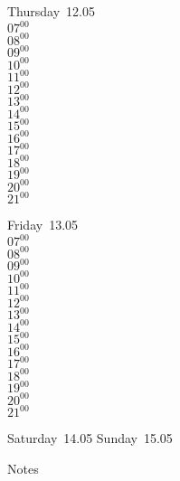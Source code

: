 \documentclass[11pt,a4paper]{book}\usepackage[]{graphicx}\usepackage[]{color}
\begin{document}
\clearpage
\begin{headerbox}
\end{headerbox}
\begin{weekdaybox}
  Thursday~12.05\\
  { 
  \vfill
  $07^{00}$\\
$08^{00}$\\
$09^{00}$\\
$10^{00}$\\
$11^{00}$\\
$12^{00}$\\
$13^{00}$\\
$14^{00}$\\
$15^{00}$\\
$16^{00}$\\
$17^{00}$\\
$18^{00}$\\
$19^{00}$\\
$20^{00}$\\
$21^{00}$\\
  }
\end{weekdaybox} 
\begin{weekdaybox}
  Friday~13.05\\
  { 
  \vfill
  $07^{00}$\\
$08^{00}$\\
$09^{00}$\\
$10^{00}$\\
$11^{00}$\\
$12^{00}$\\
$13^{00}$\\
$14^{00}$\\
$15^{00}$\\
$16^{00}$\\
$17^{00}$\\
$18^{00}$\\
$19^{00}$\\
$20^{00}$\\
$21^{00}$\\
  }
\end{weekdaybox}
\begin{weekendbox}
  Saturday~14.05
  \tcblower
  Sunday~15.05
\end{weekendbox} %
\begin{notebox}
  Notes
\end{notebox}
\clearpage
\end{document}
